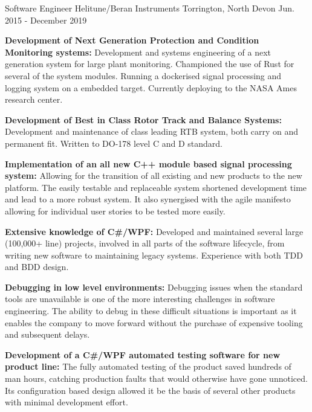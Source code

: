 \begin{cventries}
  \cventry
    {Software Engineer} %
    {Helitune/Beran Instruments} %
    {Torrington, North Devon} %
    {Jun. 2015 - December 2019} %
    {
      \begin{cvitems} %
        \item {\color{graytext}\textbf{Development of Next Generation Protection and Condition Monitoring systems:} Development and systems engineering of a next generation system for large plant monitoring. Championed the use of Rust for several of the system modules. Running a dockerised signal processing and logging system on a embedded target. Currently deploying to the NASA Ames research center.}
        \item {\color{graytext}\textbf{Development of Best in Class Rotor Track and Balance Systems:} Development and maintenance of class leading RTB system, both carry on and permanent fit. Written to DO-178 level C and D standard.}
        \item {\color{graytext}\textbf{Implementation of an all new C++ module based signal processing system:} Allowing for the transition of all existing and new products to the new platform. The easily testable and replaceable system shortened development time and lead to a more robust system. It also synergised with the agile manifesto allowing for individual user stories to be tested more easily.}
        \item {\color{graytext}\textbf{Extensive knowledge of C\#/WPF: } Developed and maintained several large (100,000+ line) projects, involved in all parts of the software lifecycle, from writing new software to maintaining legacy systems. Experience with both TDD and BDD design. }
        \item {\color{graytext}\textbf{Debugging in low level environments:} Debugging issues when the standard tools are unavailable is one of the more interesting challenges in software engineering. The ability to debug in these difficult situations is important as it enables the company to move forward without the purchase of expensive tooling and subsequent delays.}
        \item {\color{graytext}\textbf{Development of a C\#/WPF automated testing software for new product line:} The fully automated testing of the product saved hundreds of man hours, catching production faults that would otherwise have gone unnoticed. Its configuration based design allowed it be the basis of several other products with minimal development effort. }

\end{cvitems}}
\end{cventries}
